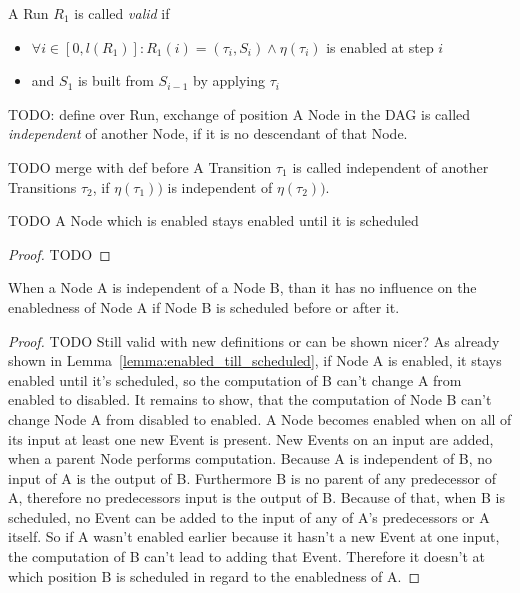 \begin{definition}[name = Valid Run]\label{def:valid_run}
  A Run \(R_1\) is called \emph{valid} if
  \begin{itemize}
    \item \(\forall i \in [0,l(R_1)]: R_1(i) = (\tau_i,S_i) \land \eta(\tau_i)\) is enabled at step \(i\)
    \item and \(S_1\) is built from \(S_{i-1}\) by applying \(\tau_i\)
  \end{itemize}
\end{definition}

\begin{definition}[name = Independence of Nodes]\label{def:node_independent}
  TODO: define over Run, exchange of position
  A Node in the DAG is called \emph{independent} of another Node, if it is no descendant of that Node.
\end{definition}

\begin{definition}[name = Independence of Transitions]\label{def:independence_transitions}
  TODO merge with def before
  A Transition \(\tau_1\) is called independent of another Transitions \(\tau_2\), if \(\eta(\tau_1))\) is independent of \(\eta(\tau_2))\).
\end{definition}


\begin{lemma}[name = Duration of Enabledness]\label{lemma:enabled_till_scheduled}
  TODO
  A Node which is enabled stays enabled until it is scheduled
\end{lemma}

\begin{proof}
TODO
\end{proof}

\begin{lemma}[name = Influence of independent Nodes]\label{lemma:independence}
  When a Node A is independent of a Node B, than it has no influence on the enabledness of Node A if Node B is scheduled before or after it.
\end{lemma}

\begin{proof}
  TODO Still valid with new definitions or can be shown nicer?
  As already shown in Lemma~\ref{lemma:enabled_till_scheduled}, if Node A is enabled, it stays enabled until it's scheduled, so the computation of B can't change A from enabled to disabled.
  It remains to show, that the computation of Node B can't change Node A from disabled to enabled.
  A Node becomes enabled when on all of its input at least one new Event is present.
  New Events on an input are added, when a parent Node performs computation.
  Because A is independent of B, no input of A is the output of B.
  Furthermore B is no parent of any predecessor of A, therefore no predecessors input is the output of B.
  Because of that, when B is scheduled, no Event can be added to the input of any of A's predecessors or A itself.
  So if A wasn't enabled earlier because it hasn't a new Event at one input, the computation of B can't lead to adding that Event.
  Therefore it doesn't at which position B is scheduled in regard to the enabledness of A.
\end{proof}

